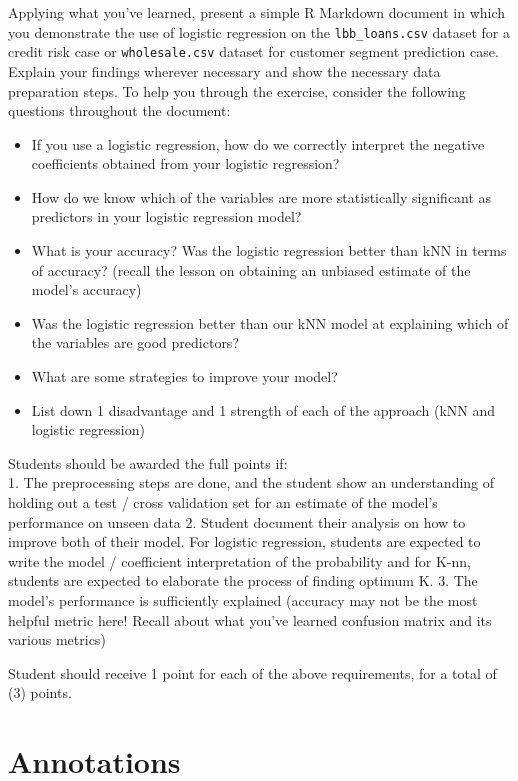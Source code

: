 \documentclass[
]{article}
\providecommand{\tightlist}{%
  \setlength{\itemsep}{0pt}\setlength{\parskip}{0pt}}
\begin{document}
Applying what you've learned, present a simple R Markdown document in
which you demonstrate the use of logistic regression on the
\texttt{lbb\_loans.csv} dataset for a credit risk case or
\texttt{wholesale.csv} dataset for customer segment prediction case.
Explain your findings wherever necessary and show the necessary data
preparation steps. To help you through the exercise, consider the
following questions throughout the document:

\begin{itemize}
\tightlist
\item
  If you use a logistic regression, how do we correctly interpret the
  negative coefficients obtained from your logistic regression?\\
\item
  How do we know which of the variables are more statistically
  significant as predictors in your logistic regression model?
\item
  What is your accuracy? Was the logistic regression better than kNN in
  terms of accuracy? (recall the lesson on obtaining an unbiased
  estimate of the model's accuracy)\\
\item
  Was the logistic regression better than our kNN model at explaining
  which of the variables are good predictors?
\item
  What are some strategies to improve your model?
\item
  List down 1 disadvantage and 1 strength of each of the approach (kNN
  and logistic regression)
\end{itemize}

Students should be awarded the full points if:\\
1. The preprocessing steps are done, and the student show an
understanding of holding out a test / cross validation set for an
estimate of the model's performance on unseen data 2. Student document
their analysis on how to improve both of their model. For logistic
regression, students are expected to write the model / coefficient
interpretation of the probability and for K-nn, students are expected to
elaborate the process of finding optimum K. 3. The model's performance
is sufficiently explained (accuracy may not be the most helpful metric
here! Recall about what you've learned confusion matrix and its various
metrics)

Student should receive 1 point for each of the above requirements, for a
total of (3) points.

\hypertarget{annotations}{%
\section{Annotations}\label{annotations}}
\end{document}
